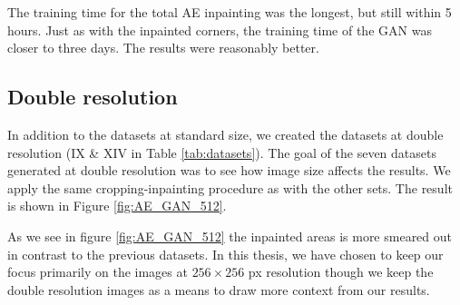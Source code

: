 \vspace{5px}
\noindent The training time for the total AE inpainting was the longest, but still within 5 hours.
Just as with the inpainted corners, the training time of the GAN was closer to three days. The results were reasonably better. 


\subsection{Double resolution}
In addition to the datasets at standard size, we created the datasets at double resolution (IX \& XIV in Table \ref{tab:datasets}).  The goal of the seven datasets generated at double resolution was to see how image size affects the results. We apply the same cropping-inpainting procedure as with the other sets. The result is shown in Figure \ref{fig:AE_GAN_512}.

As we see in figure \ref{fig:AE_GAN_512} the inpainted areas is more smeared out in contrast to the previous datasets. In this thesis, we have chosen to keep our focus primarily on the images at $256\times 256$ px resolution though we keep the double resolution images as a means to draw more context from our results.


